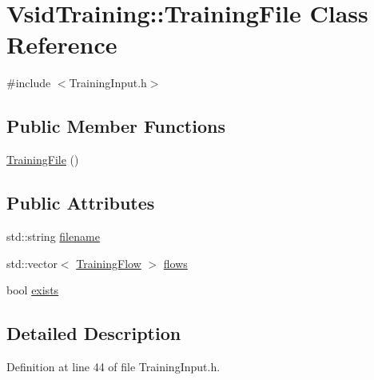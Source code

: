 \hypertarget{class_vsid_training_1_1_training_file}{\section{Vsid\-Training\-:\-:Training\-File Class Reference}
\label{class_vsid_training_1_1_training_file}
}


{\ttfamily \#include $<$Training\-Input.\-h$>$}

\subsection*{Public Member Functions}
\begin{DoxyCompactItemize}
\item 
\hyperlink{class_vsid_training_1_1_training_file_af03a781b0a6806cd83216bfe4d5633e0}{Training\-File} ()
\end{DoxyCompactItemize}
\subsection*{Public Attributes}
\begin{DoxyCompactItemize}
\item 
std\-::string \hyperlink{class_vsid_training_1_1_training_file_a91ebe9f6b1a3af67d8f4540587eadbf3}{filename}
\item 
std\-::vector$<$ \hyperlink{class_vsid_training_1_1_training_flow}{Training\-Flow} $>$ \hyperlink{class_vsid_training_1_1_training_file_aaaa833a3a302e0abe9bd081abd4b7867}{flows}
\item 
bool \hyperlink{class_vsid_training_1_1_training_file_aecdea92d40bc0dc2efc0f9cce1683618}{exists}
\end{DoxyCompactItemize}


\subsection{Detailed Description}


Definition at line 44 of file Training\-Input.\-h.




